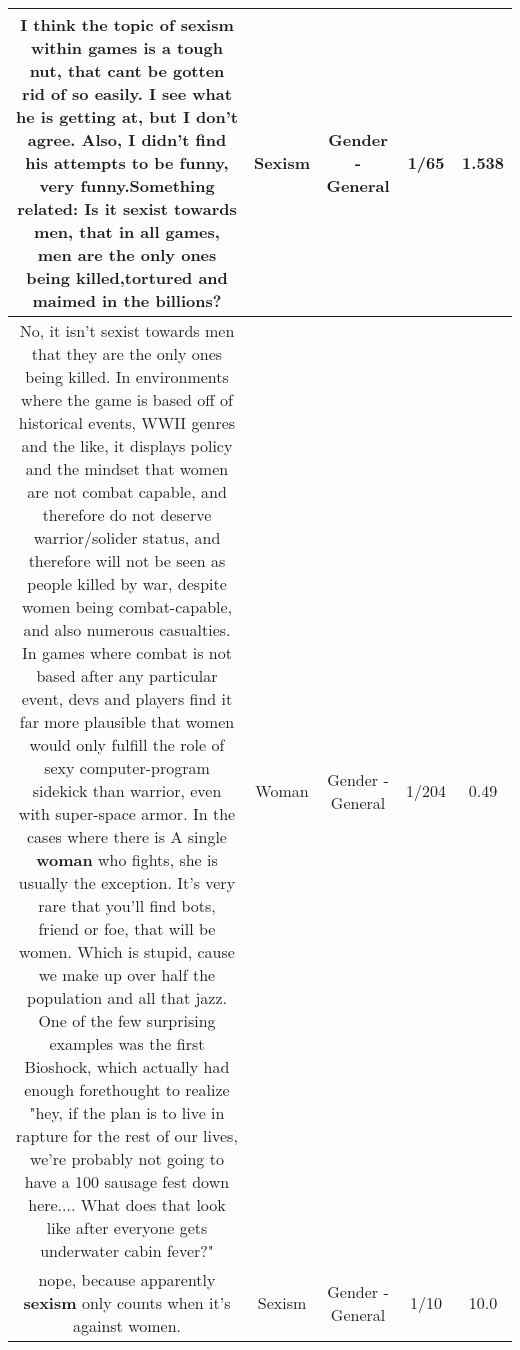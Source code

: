 \documentclass[11pt]{article}
\newlength\mylength
\begin{document}
\begin{center}
\begin{longtable}{|C{.65\mylength}|C{.30\mylength}|C{.12\mylength}|C{.12\mylength}|C{.12\mylength}|}
  \small I think the topic of \textbf{sexism} within games is a tough nut, that cant be gotten rid of so easily. I see what he is getting at, but I don't agree. Also, I didn't find his attempts to be funny, very funny.Something related: Is it sexist towards men, that in all games, men are the only ones being killed,tortured and maimed in the billions?\normalsize   & Sexism & Gender - General & 1/65 & 1.538 \\  \hline
  \small No, it isn't sexist towards men that they are the only ones being killed. In environments where the game is based off of historical events, WWII genres and the like, it displays policy and the mindset that women are not combat capable, and therefore do not deserve warrior/solider status, and therefore will not be seen as people killed by war, despite women being combat-capable, and also numerous casualties. In games where combat is not based after any particular event, devs and players find it far more plausible that women would only fulfill the role of sexy computer-program sidekick than warrior, even with super-space armor. In the cases where there is A single \textbf{woman} who fights, she is usually the exception. It's very rare that you'll find bots, friend or foe, that will be women. Which is stupid, cause we make up over half the population and all that jazz. One of the few surprising examples was the first Bioshock, which actually had enough forethought to realize "hey, if the plan is to live in rapture for the rest of our lives, we're probably not going to have a 100 sausage fest down here.... What does that look like after everyone gets underwater cabin fever?"\normalsize   & Woman & Gender - General & 1/204 & 0.49 \\  \hline
  \small nope, because apparently \textbf{sexism} only counts when it's against women.\normalsize   & Sexism & Gender - General & 1/10 & 10.0 \\  \hline

\end{longtable}
\end{center}
\end{document}

